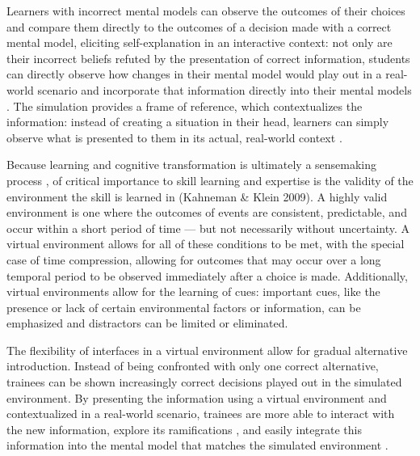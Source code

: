 \documentclass{book}
\begin{document}
Learners with incorrect mental models can observe the outcomes of their choices and compare them directly to the outcomes of a decision made with a correct mental model, eliciting self-explanation in an interactive context: not only are their incorrect beliefs refuted by the presentation of correct information, students can directly observe how changes in their mental model would play out in a real-world scenario and incorporate that information directly into their mental models \citep{Salzman1999}. The simulation provides a frame of reference, which contextualizes the information: instead of creating a situation in their head, learners can simply observe what is presented to them in its actual, real-world context \citep{Ericsson1993}.

Because learning and cognitive transformation is ultimately a sensemaking process \citep{Klein2006}, of critical importance to skill learning and expertise is the validity of the environment the skill is learned in (Kahneman \& Klein 2009). A highly valid environment is one where the outcomes of events are consistent, predictable, and occur within a short period of time — but not necessarily without uncertainty. A virtual environment allows for all of these conditions to be met, with the special case of time compression, allowing for outcomes that may occur over a long temporal period to be observed immediately after a choice is made. Additionally, virtual environments allow for the learning of cues: important cues, like the presence or lack of certain environmental factors or information, can be emphasized and distractors can be limited or eliminated.

The flexibility of interfaces in a virtual environment allow for gradual alternative introduction. Instead of being confronted with only one correct alternative, trainees can be shown increasingly correct decisions played out in the simulated environment. By presenting the information using a virtual environment and contextualized in a real-world scenario, trainees are more able to interact with the new information, explore its ramifications \citep{Ericsson1993}, and easily integrate this information into the mental model that matches the simulated environment \citep{Salzman1999}.



\end{document}
